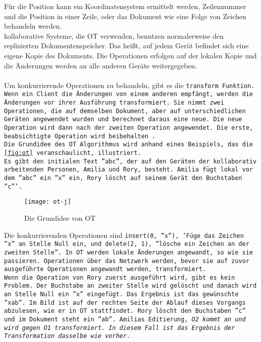Für die Position kann ein Koordinatensystem ermittelt werden, Zeilennummer und die Position in einer Zeile, oder das Dokument wie eine Folge von Zeichen behandeln werden.\\
%
\Gls{kollaborativ}e Systeme, die \gls{OT} verwenden, benutzen normalerweise den replizierten Dokumentenspeicher.
Das heißt, auf jedem Gerät befindet sich eine eigene Kopie des Dokuments.
Die Operationen erfolgen auf der lokalen Kopie und die Änderungen werden an alle anderen Geräte weitergegeben.\\\\
%
Um konkurrierende Operationen zu behandeln, gibt es die \tt{transform} Funktion.
Wenn ein Client die Änderungen von einem anderen empfängt, werden die Änderungen vor ihrer Ausführung transformiert.
Sie nimmt zwei Operationen, die auf demselben Dokument, aber auf unterschiedlichen Geräten angewendet wurden und berechnet daraus eine neue.
Die neue Operation wird dann nach der zweiten Operation angewendet. Die erste, beabsichtigte Operation wird beibehalten~\cite{ot_paper}.\\
%
Die Grundidee des \gls{OT} Algorithmus wird anhand eines Beispiels, das die \autoref{fig:ot} veranschaulicht, illustriert.\\
Es gibt den initialen Text ''abc'', der auf den Geräten der kollaborativ arbeitenden Personen, Amilia und Rory, besteht.
Amilia fügt lokal vor dem ''abc'' ein ''x'' ein, Rory löscht auf seinem Gerät den Buchstaben ''c'''.
%
\begin{figure}[h]
  \centering
  \texttt{[image: ot-j]}
  \grayRule
  \caption{Die Grundidee von \gls{OT}}
  \label{fig:ot}
\end{figure}
%
Die konkurrierenden Operationen sind \tt{insert(0, ''x'')}, 'Füge das Zeichen ''x'' an Stelle Null ein, und \tt{delete(2, 1)}, ''lösche ein Zeichen an der zweiten Stelle''.
In \gls{OT} werden lokale Änderungen angewandt, so wie sie passieren.
Operationen über das Netzwerk werden, bevor sie auf zuvor ausgeführte Operationen angewandt werden, transformiert.\\
%
Wenn die Operation von Rory zuerst ausgeführt wird, gibt es kein Problem. Der Buchstabe an zweiter Stelle wird gelöscht und danach wird an Stelle Null ein ''x'' eingefügt. Das Ergebnis ist das gewünschte ''xab''.
Im Bild ist auf der rechten Seite der Ablauf dieses Vorgangs abzulesen, wie er in \gls{OT} stattfindet.
Rory löscht den Buchstaben ''c'' und im Dokument steht ein ''ab''.
Amilias Editierung, \it{O2} kommt an und wird gegen \it{O1} transformiert. In diesem Fall ist das Ergebnis der Transformation dasselbe wie vorher.
